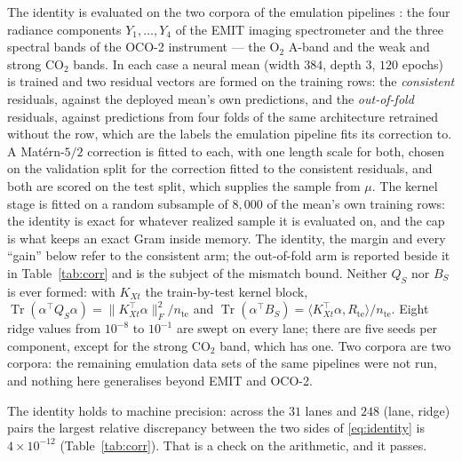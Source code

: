 \documentclass[11pt]{article}
\theoremstyle{definition}
\DeclareMathOperator{\Tr}{Tr}
\newcommand{\numCorrLanes}{31}
\newcommand{\numCorrPairs}{248}
\newcommand{\numIdentWorst}{4\times10^{-12}}
\begin{document}
The identity is evaluated on the two corpora of the emulation pipelines \cite{Shmalo26a}: the four
radiance components $Y_1,\dots,Y_4$ of the EMIT imaging spectrometer \cite{Green} and the three
spectral bands of the OCO-2 instrument \cite{Eldering,Susiluoto} --- the O$_2$ A-band and the weak and strong
CO$_2$ bands. In each case a neural mean (width $384$, depth $3$, $120$ epochs) is trained and two
residual vectors are formed on the training rows: the \emph{consistent} residuals, against the
deployed mean's own predictions, and the \emph{out-of-fold} residuals, against predictions from four
folds of the same architecture retrained without the row, which are the labels the emulation
pipeline fits its correction to. A Mat\'ern-$5/2$ correction is fitted to each, with one length
scale for both, chosen on the validation split for the correction fitted to the consistent
residuals, and both are scored on the test split, which supplies the sample from $\mu$. The kernel stage is fitted on a random subsample of
$8{,}000$ of the mean's own training rows: the identity is exact for whatever realized sample it is
evaluated on, and the cap is what keeps an exact Gram inside memory. The identity, the margin and
every ``gain'' below refer to the consistent arm; the out-of-fold arm is reported beside it in
Table~\ref{tab:corr} and is the subject of the mismatch bound. Neither $Q_S$ nor $B_S$ is ever
formed: with $K_{Xt}$ the train-by-test kernel block,
$\Tr(\alpha^\top Q_S\alpha)=\|K_{Xt}^\top\alpha\|_F^2/n_{\mathrm{te}}$ and
$\Tr(\alpha^\top B_S)=\langle K_{Xt}^\top\alpha,R_{\mathrm{te}}\rangle/n_{\mathrm{te}}$. Eight ridge
values from $10^{-8}$ to $10^{-1}$ are swept on every lane; there are five seeds per component,
except for the strong CO$_2$ band, which has one. Two corpora are two corpora: the remaining
emulation data sets of the same pipelines were not run, and nothing here generalises beyond EMIT and
OCO-2.

The identity holds to machine precision: across the $\numCorrLanes$ lanes and $\numCorrPairs$
(lane, ridge) pairs the largest relative discrepancy between the two sides of \eqref{eq:identity} is
$\numIdentWorst$ (Table~\ref{tab:corr}). That is a check on the arithmetic, and it passes.
\end{document}
